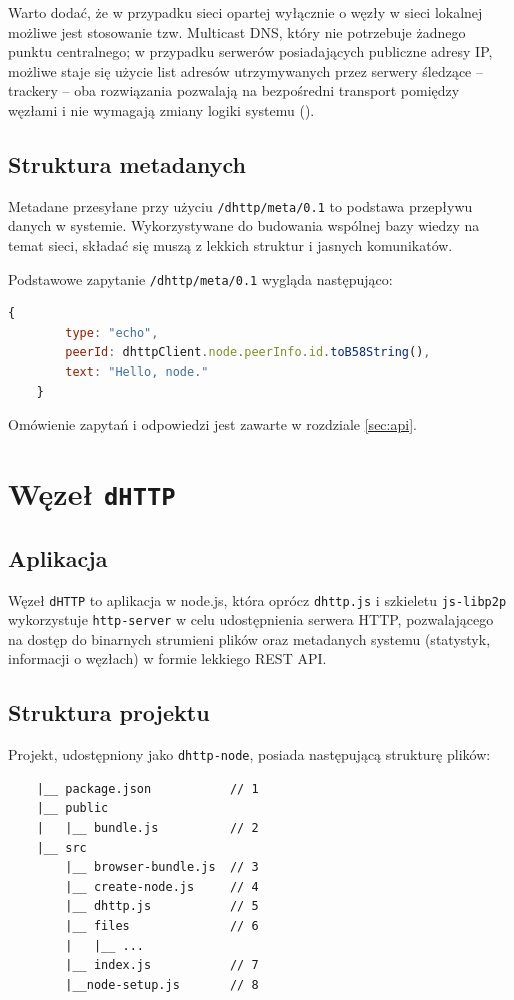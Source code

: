 Warto dodać, że w przypadku sieci opartej wyłącznie o węzły w sieci lokalnej możliwe jest stosowanie tzw. Multicast DNS, który nie potrzebuje żadnego punktu centralnego; w przypadku serwerów posiadających publiczne adresy IP, możliwe staje się użycie list adresów utrzymywanych przez serwery śledzące -- trackery -- oba rozwiązania pozwalają na bezpośredni transport pomiędzy węzłami i nie wymagają zmiany logiki systemu (\cite{discoverylibp2p}).

\subsection{Struktura metadanych}
\label{sub:metadata}

Metadane przesyłane przy użyciu \texttt{/dhttp/meta/0.1} to podstawa przepływu danych w systemie. Wykorzystywane do budowania wspólnej bazy wiedzy na temat sieci, składać się muszą z lekkich struktur i jasnych komunikatów.

Podstawowe zapytanie \texttt{/dhttp/meta/0.1} wygląda następująco:

\begin{lstlisting}[language=javascript]
    {
        type: "echo",
        peerId: dhttpClient.node.peerInfo.id.toB58String(),
        text: "Hello, node."
    }
\end{lstlisting}

Omówienie zapytań i odpowiedzi jest zawarte w rozdziale \ref{sec:api}.




\section{Węzeł \texttt{dHTTP}}

\subsection{Aplikacja}

Węzeł \texttt{dHTTP} to aplikacja w node.js, która oprócz \texttt{dhttp.js} i szkieletu \texttt{js-libp2p} wykorzystuje \texttt{http-server} w celu udostępnienia serwera HTTP, pozwalającego na dostęp do binarnych strumieni plików oraz metadanych systemu (statystyk, informacji o węzłach) w formie lekkiego REST API.

\subsection{Struktura projektu}
\label{sec:transportAlgorithm}
Projekt, udostępniony jako \texttt{dhttp-node}, posiada następującą strukturę plików:
\begin{lstlisting}
    |__ package.json           // 1
    |__ public
    |   |__ bundle.js          // 2
    |__ src
        |__ browser-bundle.js  // 3
        |__ create-node.js     // 4
        |__ dhttp.js           // 5
        |__ files              // 6
        |   |__ ...
        |__ index.js           // 7
        |__node-setup.js       // 8
\end{lstlisting}

